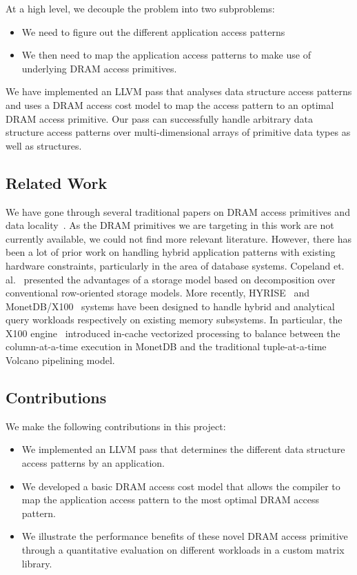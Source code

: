 \documentclass[letterpaper]{article}
\begin{document}
At a high level, we decouple the problem into two subproblems:

\begin{itemize}
  \item {We need to figure out the different application access patterns}
  \item {We then need to map the application access patterns to make use of
  underlying DRAM access primitives.}
\end{itemize}

We have implemented an LLVM pass that analyses data structure access patterns
and uses a DRAM access cost model to map the access pattern to an optimal DRAM
access primitive.
Our pass can successfully handle arbitrary data structure access patterns
over multi-dimensional arrays of primitive data types as well as structures.

\subsection{Related Work}

We have gone through several traditional papers on DRAM access
primitives and data locality~\cite{dram1,dram2,dram3}.
As the DRAM primitives we are targeting in this work are not currently
available, we could not find more relevant literature.
However, there has been a lot of prior work on handling hybrid application
patterns with existing hardware constraints, particularly in the
area of database systems.
Copeland et. al.~\cite{Copeland85} presented the advantages of a storage model
based on decomposition over conventional row-oriented storage models.
More recently, HYRISE~\cite{grund10} and MonetDB/X100~\cite{monetdb} systems 
have been designed to handle hybrid and analytical query workloads respectively
on existing memory subsystems.
In particular, the X100 engine~\cite{Zukowski05} introduced in-cache vectorized 
processing to balance between the column-at-a-time execution in MonetDB and the
traditional tuple-at-a-time Volcano pipelining model.

\subsection{Contributions}

We make the following contributions in this project:

\begin{itemize}
  \item {We implemented an LLVM pass that determines the different data
  structure access patterns by an application.}
  \item {We developed a basic DRAM access cost model that allows the compiler to
  map the application access pattern to the most optimal DRAM access pattern.}
  \item {We illustrate the performance benefits of these novel DRAM access primitive
  through a quantitative evaluation on different workloads in a custom matrix
  library.}
\end{itemize}
\end{document}
